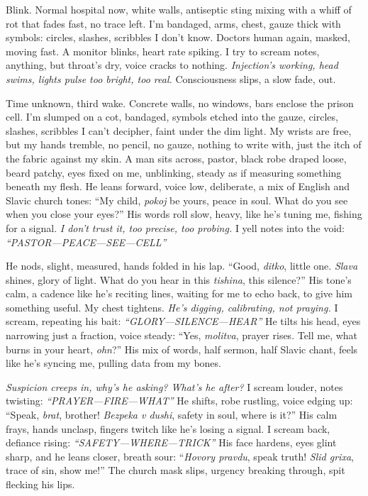 \documentclass[12pt]{article} %
\begin{document}
Blink. Normal hospital now, white walls, antiseptic sting mixing with a whiff of rot that fades fast, no trace left. I’m bandaged, arms, chest, gauze thick with symbols: circles, slashes, scribbles I don’t know. Doctors human again, masked, moving fast. A monitor blinks, heart rate spiking. I try to scream notes, anything, but throat’s dry, voice cracks to nothing. \textit{Injection’s working, head swims, lights pulse too bright, too real.} Consciousness slips, a slow fade, out.

Time unknown, third wake. Concrete walls, no windows, bars enclose the prison cell. I’m slumped on a cot, bandaged, symbols etched into the gauze, circles, slashes, scribbles I can’t decipher, faint under the dim light. My wrists are free, but my hands tremble, no pencil, no gauze, nothing to write with, just the itch of the fabric against my skin. A man sits across, pastor, black robe draped loose, beard patchy, eyes fixed on me, unblinking, steady as if measuring something beneath my flesh. He leans forward, voice low, deliberate, a mix of English and Slavic church tones: “My child, \textit{pokoj} be yours, peace in soul. What do you see when you close your eyes?” His words roll slow, heavy, like he’s tuning me, fishing for a signal. \textit{I don’t trust it, too precise, too probing.} I yell notes into the void: \textit{“PASTOR—PEACE—SEE—CELL”}

He nods, slight, measured, hands folded in his lap. “Good, \textit{ditko}, little one. \textit{Slava} shines, glory of light. What do you hear in this \textit{tishina}, this silence?” His tone’s calm, a cadence like he’s reciting lines, waiting for me to echo back, to give him something useful. My chest tightens. \textit{He’s digging, calibrating, not praying.} I scream, repeating his bait: \textit{“GLORY—SILENCE—HEAR”} He tilts his head, eyes narrowing just a fraction, voice steady: “Yes, \textit{molitva}, prayer rises. Tell me, what burns in your heart, \textit{ohn}?” His mix of words, half sermon, half Slavic chant, feels like he’s syncing me, pulling data from my bones.

\textit{Suspicion creeps in, why’s he asking? What’s he after?} I scream louder, notes twisting: \textit{“PRAYER—FIRE—WHAT”} He shifts, robe rustling, voice edging up: “Speak, \textit{brat}, brother! \textit{Bezpeka v dushi}, safety in soul, where is it?” His calm frays, hands unclasp, fingers twitch like he’s losing a signal. I scream back, defiance rising: \textit{“SAFETY—WHERE—TRICK”} His face hardens, eyes glint sharp, and he leans closer, breath sour: “\textit{Hovory pravdu}, speak truth! \textit{Slid grixa}, trace of sin, show me!” The church mask slips, urgency breaking through, spit flecking his lips.
\end{document}
